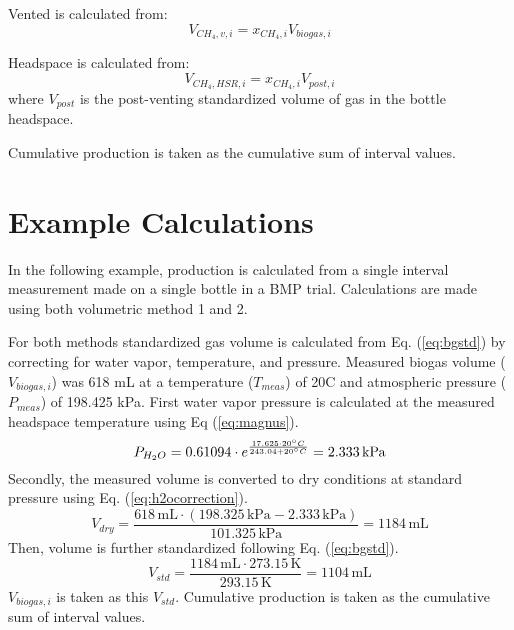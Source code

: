 \documentclass[]{article}
\newcommand{\unit}[1]{\ensuremath{\, \mathrm{#1}}}
\begin{document}
Vented  is calculated from:
\begin{equation}
  V_{CH_4, v, i} = x_{CH_4, i} V_{biogas, i}
\end{equation}

Headspace  is calculated from:
\begin{equation}
  V_{CH_4, HSR, i} = x_{CH_4, i} V_{post, i}
\end{equation}
where $V_{post}$ is the post-venting standardized volume of gas in the bottle headspace.

Cumulative production is taken as the cumulative sum of interval values. 

\section{Example Calculations}
In the following example,  production is calculated from a single interval measurement made on a single bottle in a BMP trial. Calculations are made using both volumetric method 1 and 2. 

For both methods standardized gas volume is calculated from Eq. (\ref{eq:bgstd}) by correcting for water vapor, temperature, and pressure. Measured biogas volume ($V_{biogas,i}$) was 618 mL at a temperature ($T_{meas}$) of 20\degree C and atmospheric pressure ($P_{meas}$) of 198.425 kPa.  
First water vapor pressure is calculated at the measured headspace temperature using Eq (\ref{eq:magnus}).
\begin{equation*}
   P_{H_2O} = 0.61094 \cdot e^{\frac{17.625 \cdot 20\degree C}{243.04 + 20\degree C}} = 2.333\unit{kPa}
\end{equation*}
Secondly, the measured volume is converted to dry conditions at standard pressure using Eq. (\ref{eq:h2ocorrection}).
\begin{equation*}
   V_{dry} = \frac{618\unit{mL} \cdot (198.325\unit{kPa} - 2.333\unit{kPa})}{101.325\unit{kPa}} = 1184\unit{mL}  
\end{equation*}
Then, volume is further standardized following Eq. (\ref{eq:bgstd}).
\begin{equation*}
    V_{std} = \frac{1184\unit{mL} \cdot 273.15\unit{K}}{293.15\unit{K}} = 1104\unit{mL}  
\end{equation*}
$V_{biogas,i}$ is taken as this $V_{std}$. Cumulative production is taken as the cumulative sum of interval values.
\end{document}
